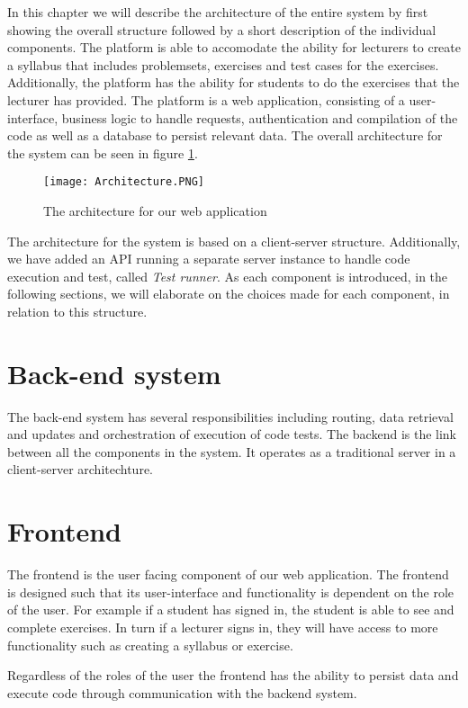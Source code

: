In this chapter we will describe the architecture of the entire system by first showing the overall structure followed by a short description of the individual components. 
The platform is able to accomodate the ability for lecturers to create a syllabus that includes problemsets, exercises and test cases for the exercises. Additionally, the platform has the ability for students to do the exercises that the lecturer has provided. 
The platform is a web application, consisting of a user-interface, business logic to handle requests, authentication and compilation of the code as well as a database to persist relevant data.
The overall architecture for the system can be seen in figure \ref{fig:Architecture}.

\begin{figure}[H]
	\texttt{[image: Architecture.PNG]}
	\centering
	\caption{The architecture for our web application}
	\label{fig:Architecture}
\end{figure}

The architecture for the system is based on a client-server structure. Additionally, we have added an API running a separate server instance to handle code execution and test, called \textit{Test runner}. As each component is introduced, in the following sections, we will elaborate on the choices made for each component, in relation to this structure.

\section{Back-end system}
The back-end system has several responsibilities including routing, data retrieval and updates and orchestration of execution of code tests. The backend is the link between all the components in the system. It operates as a traditional server in a client-server architechture. 

\section{Frontend}
The frontend is the user facing component of our web application. The frontend is designed such that its user-interface and functionality is dependent on the role of the user. 
For example if a student has signed in, the student is able to see and complete exercises. In turn if a lecturer signs in, they will have access to more functionality such as creating a syllabus or exercise.

Regardless of the roles of the user the frontend has the ability to persist data and execute code through communication with the backend system.

